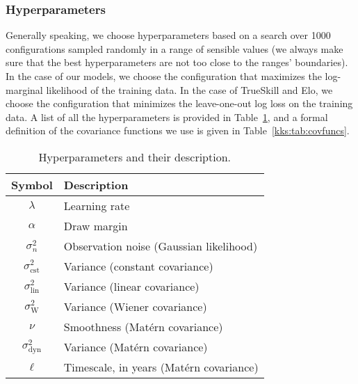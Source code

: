 \subsubsection{Hyperparameters}

Generally speaking, we choose hyperparameters based on a search over \num{1000} configurations sampled randomly in a range of sensible values (we always make sure that the best hyperparameters are not too close to the ranges' boundaries).
In the case of our models, we choose the configuration that maximizes the log-marginal likelihood of the training data.
In the case of TrueSkill and Elo, we choose the configuration that minimizes the leave-one-out log loss on the training data.
A list of all the hyperparameters is provided in Table~\ref{kks:tab:hpdefs}, and a formal definition of the covariance functions we use is given in Table~\ref{kks:tab:covfuncs}.

\begin{table}
	\centering
	\caption{
		Hyperparameters and their description.}
	\label{kks:tab:hpdefs}
	\renewcommand{\arraystretch}{1.2}
	\begin{tabular}{c l}
		\toprule
		Symbol                  & Description                             \\
		\midrule
		$\lambda$               & Learning rate                           \\
		$\alpha$                & Draw margin                             \\
		$\sigma^2_n$            & Observation noise (Gaussian likelihood) \\
		$\sigma_{\text{cst}}^2$ & Variance (constant covariance)          \\
		$\sigma_{\text{lin}}^2$ & Variance (linear covariance)            \\
		$\sigma_{\text{W}}^2$   & Variance (Wiener covariance)            \\
		$\nu$                   & Smoothness (Matérn covariance)          \\
		$\sigma_{\text{dyn}}^2$ & Variance (Matérn covariance)            \\
		$\ell$                  & Timescale, in years (Matérn covariance) \\
		\bottomrule
	\end{tabular}
\end{table}

